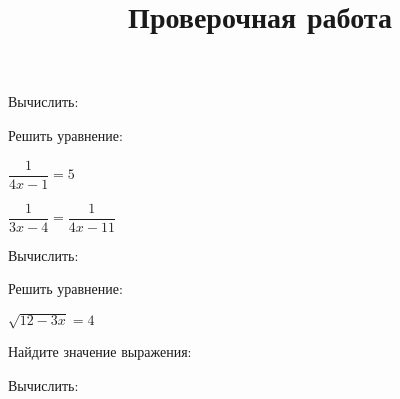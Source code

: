 \newpage
\title{Проверочная работа}
\begin{listofex}
	\item {}
	\item Вычислить:
	\begin{enumcols}[itemcolumns=2]
		\item {}
		\item {}
	\end{enumcols}
	\item {}
	\item Решить уравнение:
	\begin{enumcols}[itemcolumns=3]
		\item \( \dfrac{1}{4x-1}=5 \)
		\item \( \dfrac{1}{3x-4}=\dfrac{1}{4x-11} \)
		\item {}
	\end{enumcols}
	\item Вычислить:
	\begin{enumcols}[itemcolumns=3]
		\item {}
		\item {}
		\item {}
	\end{enumcols}
	\item Решить уравнение:
	\begin{enumcols}[itemcolumns=2]
		\item \( \sqrt{12-3x}=4 \)
		\item {}
	\end{enumcols}
	\item Найдите значение выражения:
	\begin{enumcols}[itemcolumns=3]
		\item {}
		\item {}
		\item {}
	\end{enumcols}
	\item {}
	\item Вычислить:
	\begin{enumcols}[itemcolumns=2]
		\item {}
		\item {}
	\end{enumcols}
	\item {}
\end{listofex}